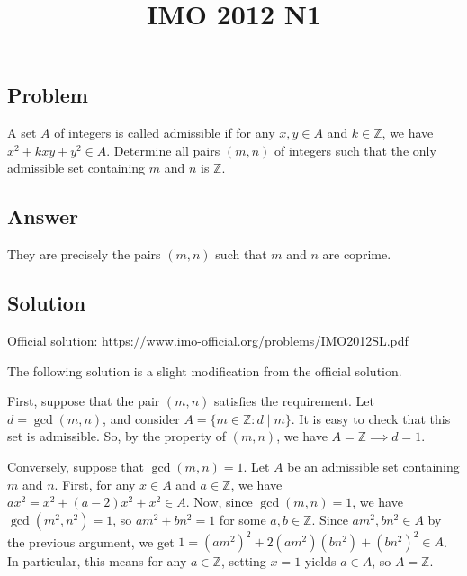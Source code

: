 \documentclass{article}
\title{IMO 2012 N1}
\author{}
\date{}
\newcommand{\Z}{\mathbb{Z}}
\begin{document}
\maketitle



\subsection*{Problem}

A set $A$ of integers is called admissible if for any $x, y \in A$ and $k \in \Z$, we have $x^2 + kxy + y^2 \in A$.
Determine all pairs $(m, n)$ of integers such that the only admissible set containing $m$ and $n$ is $\Z$.



\subsection*{Answer}

They are precisely the pairs $(m, n)$ such that $m$ and $n$ are coprime.



\subsection*{Solution}

Official solution: \url{https://www.imo-official.org/problems/IMO2012SL.pdf}

The following solution is a slight modification from the official solution.

First, suppose that the pair $(m, n)$ satisfies the requirement.
Let $d = \gcd(m, n)$, and consider $A = \{m \in \Z : d \mid m\}$.
It is easy to check that this set is admissible.
So, by the property of $(m, n)$, we have $A = \Z \implies d = 1$.

Conversely, suppose that $\gcd(m, n) = 1$.
Let $A$ be an admissible set containing $m$ and $n$.
First, for any $x \in A$ and $a \in \Z$, we have $ax^2 = x^2 + (a - 2) x^2 + x^2 \in A$.
Now, since $\gcd(m, n) = 1$, we have $\gcd(m^2, n^2) = 1$, so $am^2 + bn^2 = 1$ for some $a, b \in \Z$.
Since $am^2, bn^2 \in A$ by the previous argument, we get $1 = (am^2)^2 + 2(am^2)(bn^2) + (bn^2)^2 \in A$.
In particular, this means for any $a \in \Z$, setting $x = 1$ yields $a \in A$, so $A = \Z$.
\end{document}
